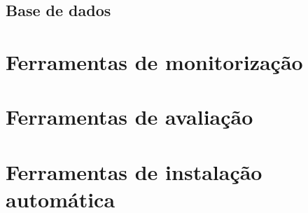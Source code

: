 \documentclass[12pt,a4paper]{article}
\begin{document}
\subsection{Base de dados}






\newpage
\section{Ferramentas de monitorização}






\newpage
\section{Ferramentas de avaliação}





\newpage
\section{Ferramentas de instalação automática}



\newpage
\end{document}
